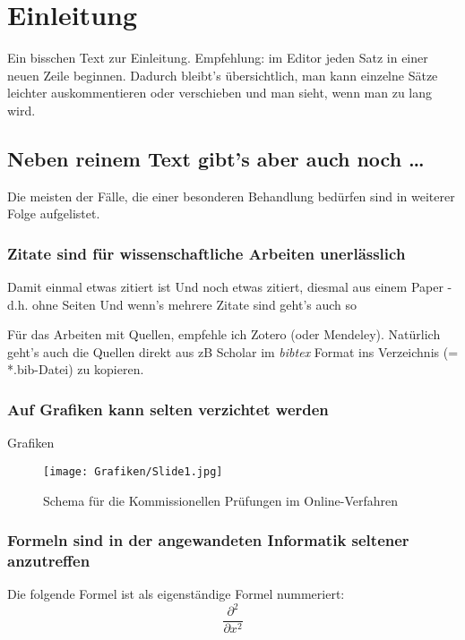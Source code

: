 \section{Einleitung}
Ein bisschen Text zur Einleitung.
Empfehlung: im Editor jeden Satz in einer neuen Zeile beginnen. 
Dadurch bleibt's übersichtlich, man kann einzelne Sätze leichter auskommentieren oder verschieben und man sieht, wenn man zu lang wird. 

\subsection{Neben reinem Text gibt's aber auch noch \ldots }
Die meisten der Fälle, die einer besonderen Behandlung bedürfen sind in weiterer Folge aufgelistet.

\subsubsection{Zitate sind für wissenschaftliche Arbeiten unerlässlich}
Damit einmal etwas zitiert ist \cite[S. 127ff.]{knuth1997}
Und noch etwas zitiert, diesmal aus einem Paper - d.h. ohne Seiten \cite{mcintosh1995}
Und wenn's mehrere Zitate sind geht's auch so \cite{mcintosh1995,knuth1997}

Für das Arbeiten mit Quellen, empfehle ich Zotero (oder Mendeley). 
Natürlich geht's auch die Quellen direkt aus zB Scholar im \textit{bibtex} Format ins Verzeichnis (= *.bib-Datei) zu kopieren. 

\cite{mcintosh1995,knuth1997, granville1992}

\subsubsection{Auf Grafiken kann selten verzichtet werden}
Grafiken 

\begin{figure}[h] %
    \centering
    \texttt{[image: Grafiken/Slide1.jpg]}
    \caption{Schema für die Kommissionellen Prüfungen im Online-Verfahren}
    \label{fig:my_label}
\end{figure}


\subsubsection{Formeln sind in der angewandeten Informatik seltener anzutreffen}
Die folgende Formel ist als eigenständige Formel nummeriert:
\begin{equation}
   \frac{\partial^2 }{\partial x^2}  %
\end{equation}


